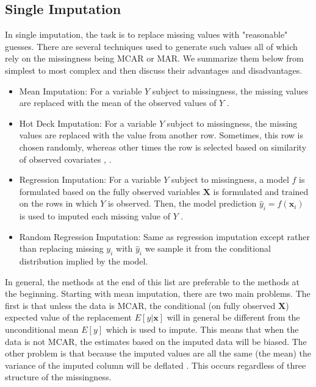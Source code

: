\documentclass[12pt,twoside]{reedthesis}
\theoremstyle{definition}
\begin{document}
\subsection{Single Imputation}
In single imputation, the task is to replace missing values with "reasonable" guesses. There are several techniques used to generate such values all of which rely on the missingness being MCAR or MAR. We summarize them below from simplest to most complex and then discuss their advantages and disadvantages. 

\begin{itemize}
\item Mean Imputation: For a variable $Y$ subject to missingness, the missing values are replaced with the mean of the observed values of $Y$ \citep{Little_1986}.

\item Hot Deck Imputation: For a variable $Y$ subject to missingness, the missing values are replaced with the value from another row. Sometimes, this row is chosen randomly, whereas other times the row is selected based on similarity of observed covariates \citep{Little_1986}, \citep{Schafer_2002}.

\item Regression Imputation: For a variable $Y$ subject to missingness, a model $f$ is formulated based on the fully observed variables $\mathbf{X}$ is formulated and trained on the rows in which $Y$ is observed. Then, the model prediction $\hat y_i = f(\mathbf{x}_i)$ is used to imputed each missing value of $Y$ \citep{Schafer_2002}.

\item Random Regression Imputation: Same as regression imputation except rather than replacing missing $y_i$ with $\hat y_i$ we sample it from the conditional distribution implied by the model.
\end{itemize}

In general, the methods at the end of this list are preferable to the methods at the beginning. Starting with mean imputation, there are two main problems. The first is that unless the data is MCAR, the conditional (on fully observed $\mathbf{X}$) expected value  of the replacement $E[y| \mathbf{x}]$ will in general be different from the unconditional mean $E[y]$ which is used to impute. This means that when the data is not MCAR, the estimates based on the imputed data will be biased. The other problem is that because the imputed values are all the same (the mean) the variance of the imputed column will be deflated \citep{Gelman_2006}. This occurs regardless of three structure of the missingness.
\end{document}
